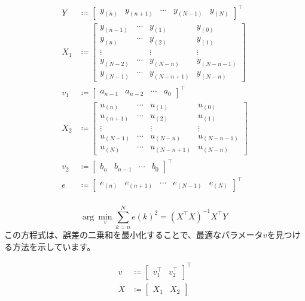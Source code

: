 \documentclass[a4paper,twocolumn]{jarticle}
\begin{document}
\begin{align*}
  Y&\coloneqq \begin{bmatrix}
    y_{(n)}&y_{(n+1)}&\cdots&y_{(N-1)}&y_{(N)}
  \end{bmatrix}^\top\\
  X_1&\coloneqq \begin{bmatrix}
    y_{(n-1)}&\cdots&y_{(1)}&y_{(0)}\\
    y_{(n)}&\cdots&y_{(2)}&y_{(1)}\\
    \vdots&&\vdots&\vdots\\
    y_{(N-2)}&\cdots&y_{(N-n)}&y_{(N-n-1)}\\
    y_{(N-1)}&\cdots&y_{(N-n+1)}&y_{(N-n)}
  \end{bmatrix}\\
  v_1&\coloneqq \begin{bmatrix}
    a_{n-1}&a_{n-2}&\cdots&a_0
  \end{bmatrix}^\top\\
  X_2&\coloneqq \begin{bmatrix}
    u_{(n)}&\cdots&u_{(1)}&u_{(0)}\\
    u_{(n+1)}&\cdots&u_{(2)}&u_{(1)}\\
    \vdots&&\vdots&\vdots\\
    u_{(N-1)}&\cdots&u_{(N-n)}&u_{(N-n-1)}\\
    u_{(N)}&\cdots&u_{(N-n+1)}&u_{(N-n)}
  \end{bmatrix}\\
  v_2&\coloneqq \begin{bmatrix}
    b_{n}&b_{n-1}&\cdots&b_0
  \end{bmatrix}^\top\\
  e&\coloneqq \begin{bmatrix}
    e_{(n)}&e_{(n+1)}&\cdots&e_{(N-1)}&e_{(N)}
  \end{bmatrix}^\top\\
\end{align*}

\[
  \mathrm{arg}~\min_v\sum_{k=n}^{N}e(k)^2=(X^\top X)^{-1}X^\top Y
\]
この方程式は、誤差の二乗和を最小化することで、最適なパラメータ\( v \)を見つける方法を示しています。

\begin{align*}
  v&\coloneqq \begin{bmatrix}
    v_1^\top&v_2^\top
  \end{bmatrix}^\top\\
  X&\coloneqq \begin{bmatrix}
    X_1&X_2
  \end{bmatrix}
\end{align*}
\end{document}
